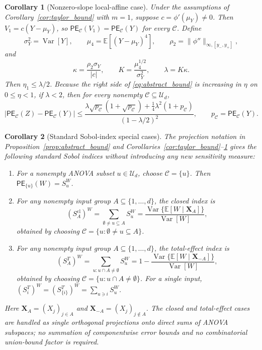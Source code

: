 \documentclass[11pt,letterpaper]{article}
\DeclareMathOperator{\Var}{Var}
\newcommand{\E}{\mathbb{E}}
\newcommand{\bX}{\boldsymbol{X}}
\newtheorem{corollary}{Corollary}
\theoremstyle{remark}
\begin{document}
\begin{corollary}[Nonzero-slope local-affine case]
\label{cor:local_affine}
Under the assumptions of Corollary~\ref{cor:taylor_bound} with $m=1$, suppose
$c=\phi'(\mu_Y)\neq0$. Then $V_1=c(Y-\mu_Y)$, so
$\mathsf{PE}_{\mathscr C}(V_1)=\mathsf{PE}_{\mathscr C}(Y)$ for every
$\mathscr C$. Define
\begin{equation}
  \sigma_Y^2=\Var[Y],\qquad
  \mu_4=\E[(Y-\mu_Y)^4],\qquad
  \rho_2=\|\phi''\|_{\infty,[y_-,y_+]},
\end{equation}
and
\begin{equation}
  \kappa=\frac{\rho_2\sigma_Y}{|c|},\qquad
  K=\frac{\mu_4^{1/2}}{\sigma_Y^2},\qquad
  \lambda=K\kappa.
  \label{eq:kappa_lambda}
\end{equation}
Then $\eta_1\leq\lambda/2$. Because the right side of
\eqref{eq:abstract_bound} is increasing in $\eta$ on $0\leq\eta<1$, if
$\lambda<2$, then for every nonempty $\mathscr C\subseteq\mathcal U_d$,
\begin{equation}
  \left|\mathsf{PE}_{\mathscr C}(Z)-\mathsf{PE}_{\mathscr C}(Y)\right|
  \leq
  \frac{
    \lambda\sqrt{p_{\mathscr C}}(1+\sqrt{p_{\mathscr C}})
    +\tfrac14\lambda^2(1+p_{\mathscr C})
  }{(1-\lambda/2)^2},
  \qquad
  p_{\mathscr C}=\mathsf{PE}_{\mathscr C}(Y).
  \label{eq:local_affine_bound}
\end{equation}
\end{corollary}

\begin{corollary}[Standard Sobol-index special cases]
\label{cor:special_cases}
The projection notation in Proposition~\ref{prop:abstract_bound} and
Corollaries~\ref{cor:taylor_bound}--\ref{cor:local_affine} gives the following
standard Sobol indices without introducing any new sensitivity measure:
\begin{enumerate}
\item For a nonempty ANOVA subset $u\in\mathcal U_d$, choose
  $\mathscr C=\{u\}$. Then $\mathsf{PE}_{\{u\}}(W)=S_u^W$.
\item For any nonempty input group $A\subseteq\{1,\ldots,d\}$, the closed index is
  \begin{equation}
    (S_A^{\mathrm{cl}})^W
      =\sum_{\emptyset\neq u\subseteq A}S_u^W
      =\frac{\Var\{\E[W\mid\bX_A]\}}{\Var[W]},
  \end{equation}
  obtained by choosing
  $\mathscr C=\{u:\emptyset\neq u\subseteq A\}$.
\item For any nonempty input group $A\subseteq\{1,\ldots,d\}$, the total-effect
  index is
  \begin{equation}
    (S_A^T)^W
      =\sum_{u:u\cap A\neq\emptyset}S_u^W
      =1-\frac{\Var\{\E[W\mid\bX_{-A}]\}}{\Var[W]},
  \end{equation}
  obtained by choosing $\mathscr C=\{u:u\cap A\neq\emptyset\}$. For a single
  input, $(S_i^T)^W=(S_{\{i\}}^T)^W=\sum_{u\ni i}S_u^W$.
\end{enumerate}
Here $\bX_A=(X_j)_{j\in A}$ and $\bX_{-A}=(X_j)_{j\notin A}$. The closed and
total-effect cases are handled as single orthogonal projections onto direct
sums of ANOVA subspaces; no summation of componentwise error bounds and no
combinatorial union-bound factor is required.
\end{corollary}
\end{document}
